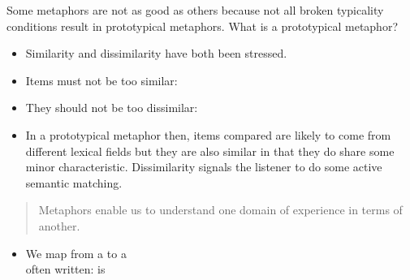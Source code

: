 \documentclass[a4paper,landscape,headrule,footrule,xetex]{foils}
\begin{document}

Some metaphors are not as good as others because not all broken typicality
conditions result in prototypical metaphors. What is a prototypical
metaphor?

\begin{itemize}
\item Similarity and dissimilarity have both been stressed.
\item Items must not be too similar:
  \begin{exe}
    \ex {}
    \ex {}
    \ex {}
  \end{exe}
\newpage
\item They should not be too dissimilar:
  \begin{exe}
    \ex {}
    \ex {}
    \ex {}
  \end{exe}
\item In a prototypical metaphor then, items compared are
likely to come from different lexical fields but they are
also similar in that they do share some minor
characteristic. Dissimilarity signals the listener to do
some active semantic matching.
\begin{exe}
  \ex {}
  \ex {}
  \ex {}
\end{exe}
\end{itemize}


\begin{quote}
 Metaphors enable us to understand one
  domain of experience in terms of another.
\hfill \citet{Lakoff:Turner:1989}
\end{quote}

\begin{itemize}
\item We map from a  to a 
\\[1.5ex] often written:  is 
\end{itemize}




\end{document}

